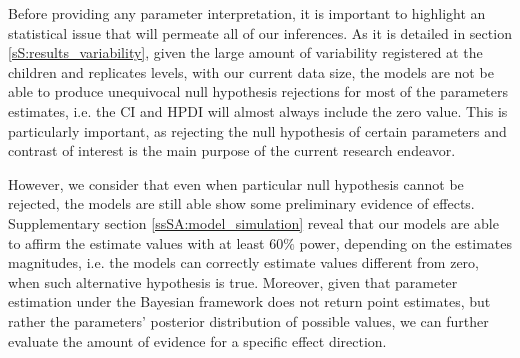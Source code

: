 Before providing any parameter interpretation, it is important to highlight an statistical issue that will permeate all of our inferences. As it is detailed in section \ref{sS:results_variability}, given the large amount of variability registered at the children and replicates levels, with our current data size, the models are not be able to produce unequivocal null hypothesis rejections for most of the parameters estimates, i.e. the CI and HPDI will almost always include the zero value. This is particularly important, as rejecting the null hypothesis of certain parameters and contrast of interest is the main purpose of the current research endeavor.

However, we consider that even when particular null hypothesis cannot be rejected, the models are still able show some preliminary evidence of effects. Supplementary section \ref{ssSA:model_simulation} reveal that our models are able to affirm the estimate values with at least $60\%$ power, depending on the estimates magnitudes, i.e. the models can correctly estimate values different from zero, when such alternative hypothesis is true. Moreover, given that parameter estimation under the Bayesian framework does not return point estimates, but rather the parameters' posterior distribution of possible values, we can further evaluate the amount of evidence for a specific effect direction. 

